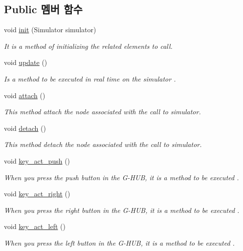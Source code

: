 \subsection*{Public 멤버 함수}
\begin{DoxyCompactItemize}
\item 
void \hyperlink{classkr_1_1ac_1_1kookmin_1_1cs_1_1call_1_1_call_hud_ab8f90240d9719e9826ae56e387f5933d}{init} (Simulator simulator)
\begin{DoxyCompactList}\small\item\em It is a method of initializing the related elements to call. \end{DoxyCompactList}\item 
void \hyperlink{classkr_1_1ac_1_1kookmin_1_1cs_1_1call_1_1_call_hud_a28fc0dce1114387424d56d65aee6b304}{update} ()
\begin{DoxyCompactList}\small\item\em Is a method to be executed in real time on the simulator . \end{DoxyCompactList}\item 
void \hyperlink{classkr_1_1ac_1_1kookmin_1_1cs_1_1call_1_1_call_hud_a647affa35bd2b8f70f6e785f817e8082}{attach} ()
\begin{DoxyCompactList}\small\item\em This method attach the node associated with the call to simulator. \end{DoxyCompactList}\item 
void \hyperlink{classkr_1_1ac_1_1kookmin_1_1cs_1_1call_1_1_call_hud_a3f58fc64836793d7010a1d46fa787e0d}{detach} ()
\begin{DoxyCompactList}\small\item\em This method detach the node associated with the call to simulator. \end{DoxyCompactList}\item 
void \hyperlink{classkr_1_1ac_1_1kookmin_1_1cs_1_1call_1_1_call_hud_af65157e5939fc455ae649e188e38933d}{key\+\_\+act\+\_\+push} ()
\begin{DoxyCompactList}\small\item\em When you press the push button in the G-\/\+H\+U\+B, it is a method to be executed . \end{DoxyCompactList}\item 
void \hyperlink{classkr_1_1ac_1_1kookmin_1_1cs_1_1call_1_1_call_hud_a3ecf7e9fb474bd63454ed6ffcf1a6396}{key\+\_\+act\+\_\+right} ()
\begin{DoxyCompactList}\small\item\em When you press the right button in the G-\/\+H\+U\+B, it is a method to be executed . \end{DoxyCompactList}\item 
void \hyperlink{classkr_1_1ac_1_1kookmin_1_1cs_1_1call_1_1_call_hud_aec9dbfa44efd5d6ae235938dbe407c48}{key\+\_\+act\+\_\+left} ()
\begin{DoxyCompactList}\small\item\em When you press the left button in the G-\/\+H\+U\+B, it is a method to be executed . \end{DoxyCompactList}\end{DoxyCompactItemize}
